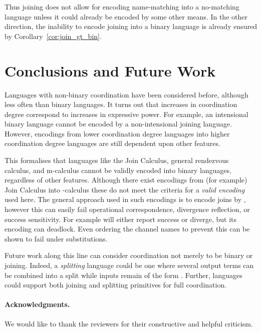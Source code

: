 \documentclass[submission,copyright,creativecommons]{eptcs}
\begin{document}
Thus joining does not allow for encoding name-matching into a no-matching language unless it could already be
encoded by some other means.
In the other direction, the inability to encode joining into a binary language is already 
ensured by Corollary~\ref{cor:join_gt_bin}.

\section{Conclusions and Future Work}
\label{sec:conclude}

Languages with non-binary coordination have been considered before, although
less often than binary languages.
It turns out that increases in coordination degree correspond to increases in expressive power.
For example, an intensional binary language
cannot be encoded by a non-intensional joining language.
However, encodings from lower coordination degree languages into higher coordination degree
languages are still dependent upon other features.

This formalises that languages like the Join Calculus, general rendezvous calculus, and m-calculus
cannot be validly encoded into binary languages, regardless of other features.
Although there exist encodings from (for example) Join Calculus into -calculus
\cite{Fournet_thereflexive}
these do not meet the criteria for a {\em valid encoding} used here.
The general approach used in such encodings is to encode joins by
,
however this can easily fail operational correspondence, divergence reflection, or success sensitivity.
For example
 will either report success or diverge, but its encoding can deadlock.
Even ordering the channel names to prevent this can be shown to fail under substitutions.

Future work along this line can consider coordination not merely to be binary or joining.
Indeed, a {\em splitting} language could be one where several output terms can be combined into
a split  while inputs remain of the form .
Further, languages could support both joining and splitting primitives for full coordination.

\paragraph{Acknowledgments.} We would like to thank the reviewers for their constructive and helpful criticism.



\end{document}
